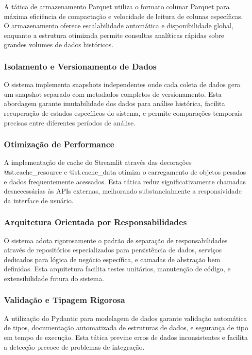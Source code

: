 \documentclass[12pt,a4paper]{article}
\begin{document}
A tática de armazenamento Parquet utiliza o formato colunar Parquet para máxima eficiência de compactação e velocidade de leitura de colunas específicas. O armazenamento oferece escalabilidade automática e disponibilidade global, enquanto a estrutura otimizada permite consultas analíticas rápidas sobre grandes volumes de dados históricos.

\subsubsection{Isolamento e Versionamento de Dados}

O sistema implementa snapshots independentes onde cada coleta de dados gera um snapshot separado com metadados completos de versionamento. Esta abordagem garante imutabilidade dos dados para análise histórica, facilita recuperação de estados específicos do sistema, e permite comparações temporais precisas entre diferentes períodos de análise.

\subsubsection{Otimização de Performance}

A implementação de cache do Streamlit através das decorações @st.cache\_resource e @st.cache\_data otimiza o carregamento de objetos pesados e dados frequentemente acessados. Esta tática reduz significativamente chamadas desnecessárias às APIs externas, melhorando substancialmente a responsividade da interface de usuário.

\subsubsection{Arquitetura Orientada por Responsabilidades}

O sistema adota rigorosamente o padrão de separação de responsabilidades através de repositórios especializados para persistência de dados, serviços dedicados para lógica de negócio específica, e camadas de abstração bem definidas. Esta arquitetura facilita testes unitários, manutenção de código, e extensibilidade futura do sistema.

\subsubsection{Validação e Tipagem Rigorosa}

A utilização do Pydantic para modelagem de dados garante validação automática de tipos, documentação automatizada de estruturas de dados, e segurança de tipo em tempo de execução. Esta tática previne erros de dados inconsistentes e facilita a detecção precoce de problemas de integração.
\end{document}
